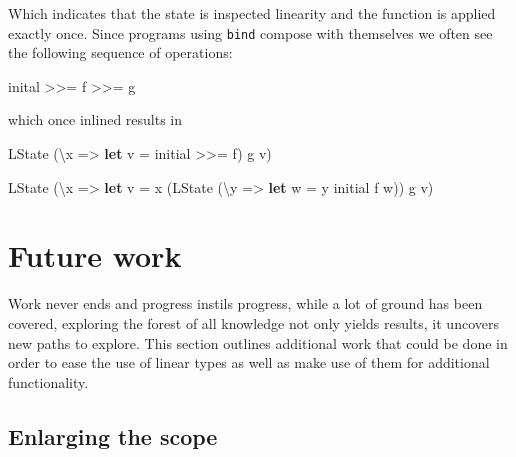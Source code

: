 \documentclass[
]{article}
\newenvironment{Shaded}{}{}
\newcommand{\DataTypeTok}[1]{\textcolor[rgb]{0.56,0.13,0.00}{#1}}
\newcommand{\KeywordTok}[1]{\textcolor[rgb]{0.00,0.44,0.13}{\textbf{#1}}}
\newcommand{\NormalTok}[1]{#1}
\newcommand{\OperatorTok}[1]{\textcolor[rgb]{0.40,0.40,0.40}{#1}}
\newcommand{\OtherTok}[1]{\textcolor[rgb]{0.00,0.44,0.13}{#1}}
\begin{document}
Which indicates that the state is inspected linearity and the function
is applied exactly once. Since programs using \texttt{bind} compose with
themselves we often see the following sequence of operations:

\begin{Shaded}
\begin{Highlighting}[]
\NormalTok{inital }\OperatorTok{\textgreater{}\textgreater{}=}\NormalTok{ f }\OperatorTok{\textgreater{}\textgreater{}=}\NormalTok{ g}
\end{Highlighting}
\end{Shaded}

which once inlined results in

\begin{Shaded}
\begin{Highlighting}[]
\DataTypeTok{LState}\NormalTok{ (\textbackslash{}x }\OtherTok{=\textgreater{}} \KeywordTok{let}\NormalTok{ v }\OtherTok{=}\NormalTok{ initial }\OperatorTok{\textgreater{}\textgreater{}=}\NormalTok{ f)}
\NormalTok{                  g v)}
\end{Highlighting}
\end{Shaded}

\begin{Shaded}
\begin{Highlighting}[]
\DataTypeTok{LState}\NormalTok{ (\textbackslash{}x }\OtherTok{=\textgreater{}} \KeywordTok{let}\NormalTok{ v }\OtherTok{=}\NormalTok{ x (}\DataTypeTok{LState}\NormalTok{ (\textbackslash{}y }\OtherTok{=\textgreater{}} \KeywordTok{let}\NormalTok{ w }\OtherTok{=}\NormalTok{ y initial }
\NormalTok{                                           f w))}
\NormalTok{                  g v)}
\end{Highlighting}
\end{Shaded}

\newpage

\hypertarget{future-work}{%
\section{Future work}\label{future-work}}

Work never ends and progress instils progress, while a lot of ground has
been covered, exploring the forest of all knowledge not only yields
results, it uncovers new paths to explore. This section outlines
additional work that could be done in order to ease the use of linear
types as well as make use of them for additional functionality.

\hypertarget{enlarging-the-scope}{%
\subsection{Enlarging the scope}\label{enlarging-the-scope}}
\end{document}

